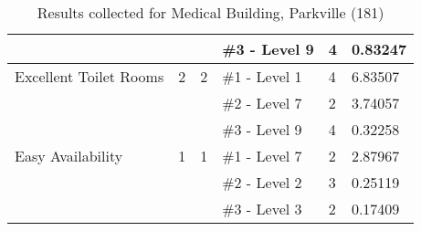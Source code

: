 \begin{table}[H]
{\begin{tabular}{|l|l|l|l|l|l|}
                         &                            &                                     & \#3   - Level 9 & 4             & 0.83247         \\ \hline
Excellent   Toilet Rooms & 2                          & 2                                   & \#1 -   Level 1 & 4             & 6.83507         \\ \hline
                         &                            &                                     & \#2   - Level 7 & 2             & 3.74057         \\ \hline
                         &                            &                                     & \#3   - Level 9 & 4             & 0.32258         \\ \hline
Easy   Availability      & 1                          & 1                                   & \#1   - Level 7 & 2             & 2.87967         \\ \hline
                         &                            &                                     & \#2   - Level 2 & 3             & 0.25119         \\ \hline
                         &                            &                                     & \#3   - Level 3 & 2             & 0.17409         \\ \hline
\end{tabular}
}
\caption{Results collected for Medical Building, Parkville (181)}
\label{appendix:medical_floor_to}
\end{table}

